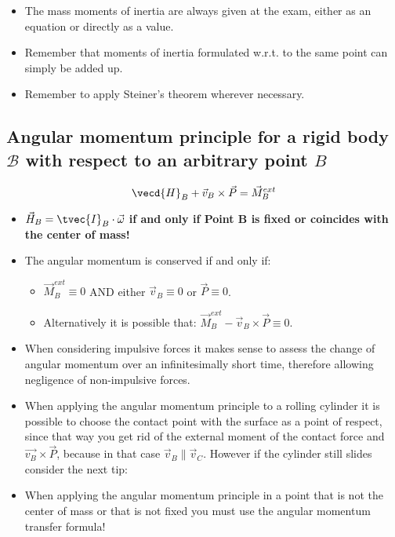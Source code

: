 \documentclass[10pt,a4paper]{scrartcl}
\begin{document}
\begin{multicols*}{2}
\begin{itemize}
\item The mass moments of inertia are always given at the exam, either as an equation or directly as a value.
\item Remember that moments of inertia formulated w.r.t. to the same point can simply be added up.
\item Remember to apply Steiner's theorem wherever necessary.
\end{itemize}

\subsection{Angular momentum principle for a rigid body $\mathcal{B}$ with respect to an arbitrary point $B$}

\begin{equation*}
\vecd{H}_B+\vec{v}_B\times\vec{P}=\vec{M}_B^{ext}
\end{equation*}


\begin{itemize}
\item $\vec{H}_B = \tvec{I}_B\cdot\vec{\omega}$ \textbf{if and only if Point B is fixed or coincides with the center of mass!}
\item The angular momentum is conserved if and only if:
\begin{itemize}
\item $\vec{M}_B^{ext}\equiv 0$ AND either $\vec{v}_B\equiv 0$ or $\vec{P}\equiv 0$.
\item Alternatively it is possible that: $\vec{M}_B^{ext}-\vec{v}_B\times\vec{P}\equiv 0$.
\end{itemize}
\item When considering impulsive forces it makes sense to assess the change of angular momentum over an infinitesimally short time, therefore allowing negligence of non-impulsive forces.
\item When applying the angular momentum principle to a rolling cylinder it is possible to choose the contact point with the surface as a point of respect, since that way you get rid of the external moment of the contact force and $\vec{v_B}\times\vec{P}$, because in that case $\vec{v}_B\parallel\vec{v}_C$. However if the cylinder still slides consider the next tip:
\item When applying the angular momentum principle in a point that is not the center of mass or that is not fixed you must use the angular momentum transfer formula!
\end{itemize}


\end{multicols*}
\end{document}
